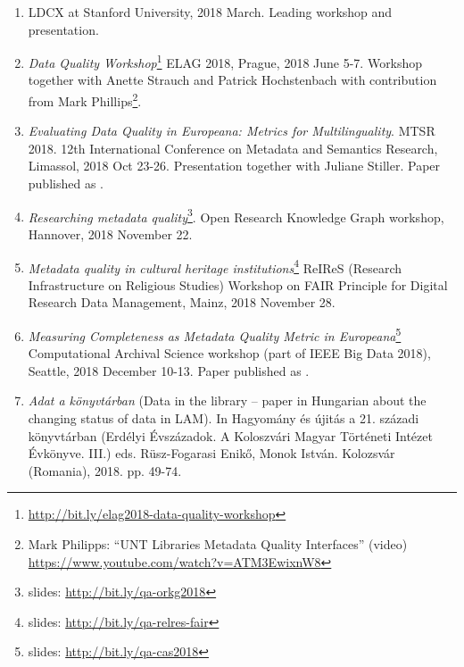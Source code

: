 \begin{enumerate}
\item LDCX at Stanford University, 2018 March. Leading workshop and presentation.
\item \emph{Data Quality Workshop}\footnote{\url{http://bit.ly/elag2018-data-quality-workshop}} ELAG 2018, Prague, 2018 June 5-7. Workshop together with Anette Strauch and Patrick Hochstenbach with contribution from Mark Phillips\footnote{Mark Philipps: ``UNT Libraries Metadata Quality Interfaces'' (video) \url{https://www.youtube.com/watch?v=ATM3EwixnW8}}.
\item \emph{Evaluating Data Quality in Europeana:
Metrics for Multilinguality}. MTSR 2018. 12th International Conference on Metadata and Semantics Research, Limassol, 2018 Oct 23-26. Presentation together with Juliane Stiller. Paper published as \cite{kiraly-et-al2018}.
\item \emph{Researching metadata quality}\footnote{slides: \url{http://bit.ly/qa-orkg2018}}. Open Research Knowledge Graph workshop, Hannover, 2018 November 22.
\item \emph{Metadata quality in cultural heritage institutions}\footnote{slides: \url{http://bit.ly/qa-relres-fair}} ReIReS (Research Infrastructure on Religious Studies) Workshop on FAIR Principle for Digital Research Data Management, Mainz, 2018 November 28.
\item \emph{Measuring Completeness as Metadata Quality Metric in Europeana}\footnote{slides: \url{http://bit.ly/qa-cas2018}} Computational Archival Science workshop (part of IEEE Big Data 2018), Seattle, 2018 December 10-13. Paper published as \cite{kiraly2018}.
\item \emph{Adat a könyvtárban} (Data in the library -- paper in Hungarian about the changing status of data in LAM). In Hagyomány és újitás a 21. századi könyvtárban (Erdélyi Évszázadok. A Koloszvári Magyar Történeti Intézet Évkönyve. III.) eds. Rüsz-Fogarasi Enikő, Monok István. Kolozsvár (Romania), 2018. pp. 49-74.
\end{enumerate}
